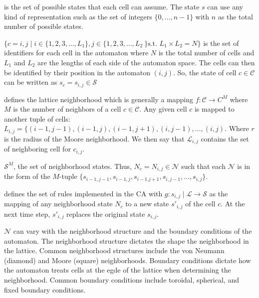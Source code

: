 \begin{CAdef}
    \itemS is the set of possible states that each cell can assume. The state $s$ can use any kind of representation such as the set of integers $\lbrace 0,\ldots,n-1\rbrace$ with $n$ as the total number of possible states.
    
    \itemC $\lbrace c = {i,j} \mid i \in \lbrace 1,2,3,\dots,L_1 \rbrace, j \in \lbrace 1,2,3,\dots,L_2\ \rbrace \text{s.t. } L_1 \times L_2 = N \rbrace$ is the set of identifiers for each cell in the automaton where $N$ is the total number of cells and $L_1$ and $L_2$ are the lengths of each side of the automaton space. The cells can then be identified by their position in the automaton $(i,j)$. So, the state of cell $c \in \mathcal{C}$ can be written as $s_c = s_{i,j} \in \mathcal{S}$
    
    \itemL defines the lattice neighborhood which is generally a mapping $f : \mathcal{C} \rightarrow C^M$ where $M$ is the number of neighbors of a cell $c \in \mathcal{C}$. Any given cell $c$ is mapped to another tuple of cells: $L_{i,j} = \lbrace (i-1,j-1), (i-1, j), (i-1, j+1), (i, j-1), \dots, (i,j)$. Where $r$ is the radius of the Moore neighborhood. We then say that $\mathcal{L}_{i,j}$ contains the set of neighboring cell for $c_{i,j}$.
    
    \itemN $\mathcal{S}^M$, the set of neighborhood states. Thus, $N_c = N_{i,j} \in \mathcal{N}$ such that each $\mathcal{N}$ is in the form of the $M$-tuple $\lbrace s_{i-1,j-1}, s_{i-1, j}, s_{i-1. j+1}, s_{i, j-1}, \dots, s_{i,j} \rbrace$.
    
    \itemR defines the set of rules implemented in the CA with $g : s_{i,j} \mid \mathcal{L} \rightarrow \mathcal{S}$ as the mapping of any neighborhood state $N_c$ to a new state $s'_{i,j}$ of the cell $c$. At the next time step, $s'_{i,j}$ replaces the original state $s_{i,j}$.
\end{CAdef}

$\mathcal{N}$ can vary with the neighborhood structure and the boundary conditions of the automaton. The neighborhood structure dictates the shape the neighborhood in the lattice. Common neighborhood structures include the von Neumann (diamond) and Moore (square) neighborhoods. Boundary conditions dictate how the automaton treats cells at the egde of the lattice when determining the neighborhood. Common boundary conditions include toroidal, spherical, and fixed boundary conditions. 

